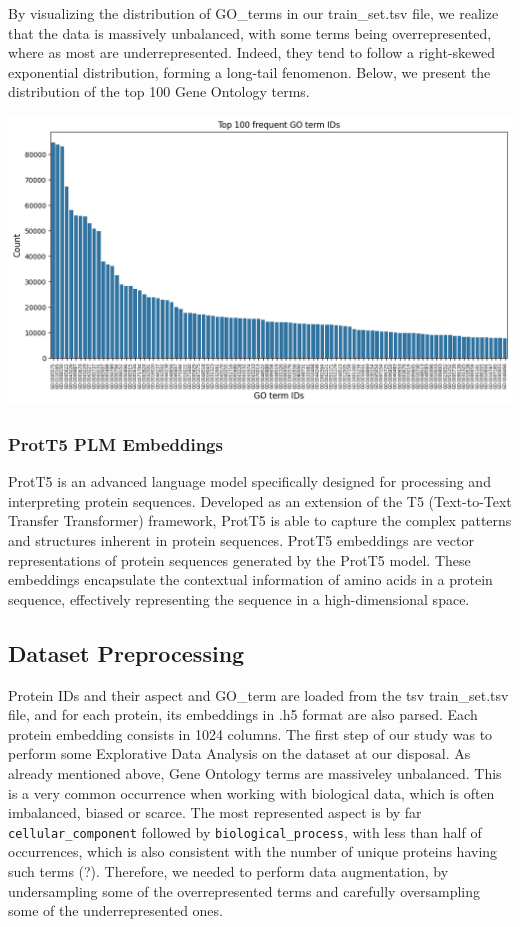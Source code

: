 \documentclass[10pt,twocolumn,letterpaper]{article}
\begin{document}
By visualizing the distribution of GO\_terms in our train\_set.tsv file, we realize that the data is massively unbalanced, with some terms being overrepresented, where as most are underrepresented.
Indeed, they tend to follow a right-skewed exponential distribution, forming a long-tail fenomenon.
Below, we present the distribution of the top 100 Gene Ontology terms.

\begin{center}
    \includegraphics[scale=0.25]{img/go_terms_distribution.png} \\
\end{center}


\subsubsection{ProtT5 PLM Embeddings}

ProtT5 is an advanced language model specifically designed for processing and interpreting protein sequences. Developed as an extension of the T5 (Text-to-Text Transfer Transformer) framework, ProtT5 is able to capture the complex patterns and structures inherent in protein sequences.
ProtT5 embeddings are vector representations of protein sequences generated by the ProtT5 model. These embeddings encapsulate the contextual information of amino acids in a protein sequence, effectively representing the sequence in a high-dimensional space.

\subsection{Dataset Preprocessing}

Protein IDs and their aspect and GO\_term are loaded from the tsv train\_set.tsv file, and for each protein, 
its embeddings in .h5 format are also parsed. Each protein embedding consists in 1024 columns.
The first step of our study was to perform some Explorative Data Analysis on the dataset at our disposal.
As already mentioned above, Gene Ontology terms are massiveley unbalanced. This is a very common occurrence when working
with biological data, which is often imbalanced, biased or scarce.
The most represented aspect is by far \texttt{cellular\_component} followed by \texttt{biological\_process}, with less than half of occurrences,
which is also consistent with the number of unique proteins having such terms (?).
Therefore, we needed to perform data augmentation, by undersampling some of the overrepresented terms and carefully oversampling some of the underrepresented ones.
\end{document}
